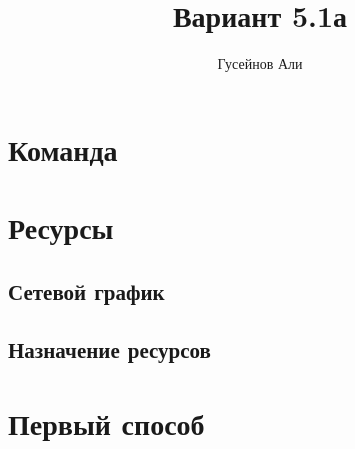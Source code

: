\documentclass{article}
\title{Вариант 5.1а}
\author{Гусейнов Али}
\begin{document}
\maketitle
\tableofcontents
\clearpage
\section{Команда}
\section{Ресурсы}
	\subsection{Сетевой график}
	\subsection{Назначение ресурсов}
\section{Первый способ}
	
\end{document}
